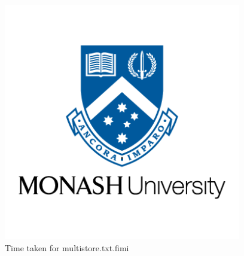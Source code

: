 \documentclass[10pt,a4paper]{article}
\begin{document}
\vspace{2cm}

\begin{figure}[h!]
\begin{center}
  \includegraphics[width=28em]{monash-university-logo.png}
\end{center}
  \caption{Time taken for multistore.txt.fimi}
  \label{fig:SSPresults1}
\end{figure}

\pagebreak


\vspace{2cm}
\end{document}
